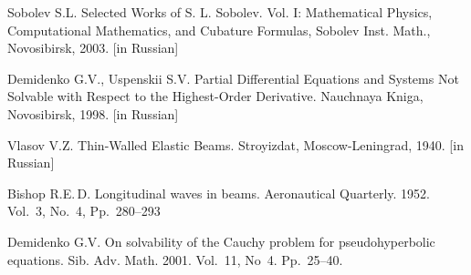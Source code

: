 \documentclass[12pt]{llncs}
\begin{document}



\begin{thebibliography}{9} %

 Sobolev S.L. 
 Selected Works of S. L. Sobolev. Vol. I: Mathematical Physics, Computational Mathematics, and Cubature Formulas, Sobolev Inst. Math., Novosibirsk,  2003. [in Russian]

Demidenko G.V., Uspenskii S.V. Partial Differential Equations and Systems Not Solvable with Respect to the Highest-Order Derivative. Nauchnaya Kniga, Novosibirsk, 1998. [in Russian]

 Vlasov V.Z. Thin-Walled Elastic Beams. Stroyizdat, Moscow-Leningrad,  1940. [in Russian]

 Bishop R.E.\,D. Longitudinal waves in beams. 
Aeronautical Quarterly. 1952. Vol.~3,  No.~4, Pp.~280--293 

 Demidenko G.V. On solvability of the Cauchy problem for pseudohyperbolic equations.
Sib. Adv. Math. 2001. Vol.~11, No~4. Pp.~25--40.





\end{thebibliography}
\end{document}
